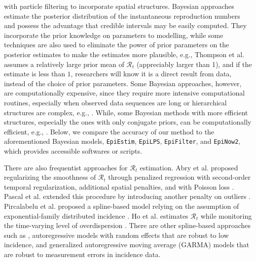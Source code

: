 \documentclass[10pt,letterpaper]{article}
\def\EpiEstim{\texttt{EpiEstim}}
\def\EpiLPS{\texttt{EpiLPS}}
\def\EpiFilter{\texttt{EpiFilter}}
\def\EpiNow2{\texttt{EpiNow2}}
\def\calR{\mathcal{R}}
\begin{document}
with particle filtering to incorporate spatial structures. 
Bayesian approaches estimate the posterior distribution of the instantaneous
reproduction numbers and possess the advantage that credible intervals may be
easily computed. They incorporate the prior knowledge on parameters to 
modelling, while some techniques are also used to eliminate the power of prior parameters on 
the posterior estimates to make the estimates more plausible, e.g., 
Thompson et al. \cite{thompson2019improved} assumes a relatively large prior mean of $\calR_t$ 
(appreciably larger than 1), and if the estimate is less than $1$, researchers will 
know it is a direct result from data, instead of the choice of prior parameters.
Some Bayesian approaches, however, are computationally expensive, since they 
require more intensive computational routines, especially when observed
data sequences are long or hierarchical structures are complex, e.g., 
\cite{abbott2020estimating}. While, some Bayesian methods with more efficient structures, 
especially the ones with only conjugate priors, can be computationally efficient,
e.g., \cite{cori2013new}. Below, we compare the accuracy of our method to the aforementioned Bayesian models,
\EpiEstim, \EpiLPS, \EpiFilter, and \EpiNow2, which provides accessible softwares or scripts. 


There are also frequentist approaches for $\calR_t$ estimation.
Abry et al. proposed regularizing the smoothness of $\calR_t$ through
penalized regression with second-order temporal regularization, additional
spatial penalties, and with Poisson loss \cite{abry2020spatial}. Pascal et al. extended
this procedure by introducing another penalty on outliers \cite{pascal2022nonsmooth}.
Pircalabelu et al. proposed a spline-based model relying on the
assumption of exponential-family distributed incidence \cite{pircalabelu2023spline}. 
Ho et al. estimates $\calR_t$ while monitoring the time-varying level of overdispersion \cite{ho2023accounting}.
There are other spline-based approaches such as
\cite{azmon2014estimation,gressani2021approximate}, autoregressive models with
random effects \cite{jin2023epimix} that are robust to low incidence, and
generalized autoregressive moving average (GARMA) models
\cite{hettinger2023estimating} that are robust to measurement errors in
incidence data. 
\end{document}
